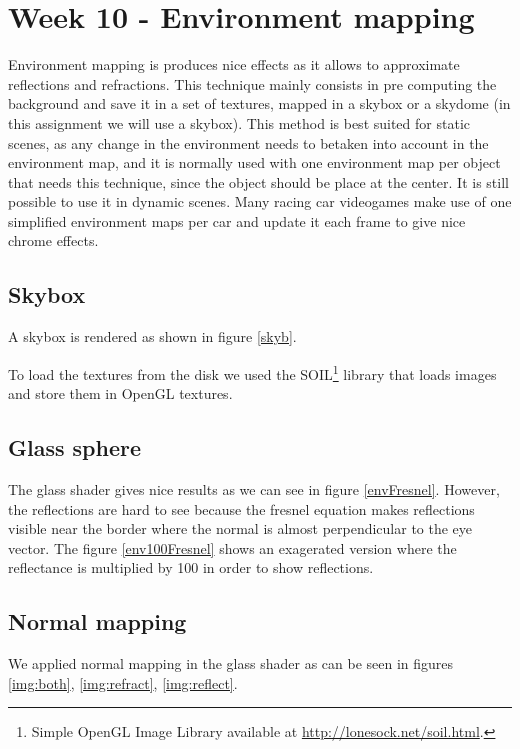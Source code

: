 \chapter{Week 10 - Environment mapping}

Environment mapping is produces nice effects as it allows to approximate reflections
and refractions. This technique mainly consists in pre computing the background and
save it in a set of textures, mapped in a skybox or a skydome (in this assignment we
will use a skybox). This method is best suited for static scenes, as any change in
the environment needs to betaken into account in the environment map, and it is normally
used with one environment map per object that needs this technique, since the object should
be place at the center. It is still possible to use it in dynamic scenes. Many racing
car videogames make use of one simplified environment maps per car and update it each
frame to give nice chrome effects.

\section{Skybox}

A skybox is rendered as shown in figure \ref{skyb}.

To load the textures from the disk we used the SOIL\footnote{Simple OpenGL Image Library available at \url{http://lonesock.net/soil.html}.}
library that loads images and store them in OpenGL textures.


\section{Glass sphere}


The glass shader gives nice results as we can see in figure \ref{envFresnel}.
However, the reflections are hard to see because the fresnel equation makes reflections
visible near the border where the normal is almost perpendicular to the eye vector.
The figure \ref{env100Fresnel} shows an exagerated version where the reflectance
is multiplied by 100 in order to show reflections.



\section{Normal mapping}

We applied normal mapping in the glass shader as can be seen in figures \ref{img:both}, \ref{img:refract}, \ref{img:reflect}.


